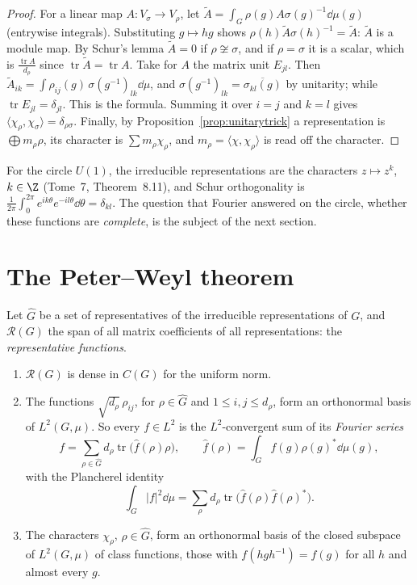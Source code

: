 \begin{proof}
For a linear map $A:V_\sigma\to V_\rho$, let $\tilde A=\int_G\rho(g)A\sigma(g)^{-1}\dd\mu(g)$ (entrywise integrals). Substituting $g\mapsto hg$ shows $\rho(h)\tilde A\sigma(h)^{-1}=\tilde A$: $\tilde A$ is a module map. By Schur's lemma $\tilde A=0$ if $\rho\not\cong\sigma$,
and if $\rho=\sigma$ it is a scalar, which is $\frac{\operatorname{tr}A}{d_\rho}$ since $\operatorname{tr}\tilde A=\operatorname{tr}A$. Take for $A$ the matrix unit $E_{jl}$. Then $\tilde A_{ik}=\int\rho_{ij}(g)\,\sigma(g^{-1})_{lk}\dd\mu$, and $\sigma(g^{-1})_{lk}=\overline{\sigma_{kl}(g)}$
by unitarity; while $\operatorname{tr}E_{jl}=\delta_{jl}$. This is the formula. Summing it over $i=j$ and $k=l$ gives $\langle\chi_\rho,\chi_\sigma\rangle=\delta_{\rho\sigma}$. Finally, by Proposition~\ref{prop:unitarytrick} a representation is $\bigoplus m_\rho\rho$, its
character is $\sum m_\rho\chi_\rho$, and $m_\rho=\langle\chi,\chi_\rho\rangle$ is read off the character.
\end{proof}

For the circle $U(1)$, the irreducible representations are the characters $z\mapsto z^k$, $k\in\Z$ (Tome~7, Theorem~8.11), and Schur orthogonality is $\frac1{2\pi}\int_0^{2\pi}e^{ik\theta}e^{-il\theta}\dd\theta=\delta_{kl}$. The question that Fourier answered on the
circle, whether these functions are \emph{complete}, is the subject of the next section.

\section{The Peter--Weyl theorem}

Let $\widehat G$ be a set of representatives of the irreducible representations of $G$, and $\mathcal R(G)$ the span of all matrix coefficients of all representations: the \emph{representative functions}.

\begin{theorem}\label{thm:peterweyl}
\begin{enumerate}[label=(\alph*)]
\item $\mathcal R(G)$ is dense in $C(G)$ for the uniform norm.
\item The functions $\sqrt{d_\rho}\,\rho_{ij}$, for $\rho\in\widehat G$ and $1\le i,j\le d_\rho$, form an orthonormal basis of $L^2(G,\mu)$. So every $f\in L^2$ is the $L^2$-convergent sum of its \emph{Fourier series}
\[
f=\sum_{\rho\in\widehat G}d_\rho\operatorname{tr}\bigl(\hat f(\rho)\rho\bigr),\qquad\hat f(\rho)=\int_Gf(g)\rho(g)^*\dd\mu(g),
\]
with the Plancherel identity
\[
\int_G|f|^2\dd\mu=\sum_\rho d_\rho\operatorname{tr}\bigl(\hat f(\rho)\hat f(\rho)^*\bigr).
\]
\item The characters $\chi_\rho$, $\rho\in\widehat G$, form an orthonormal basis of the closed subspace of $L^2(G,\mu)$ of class functions, those with $f(hgh^{-1})=f(g)$ for all $h$ and almost every $g$.
\end{enumerate}
\end{theorem}

